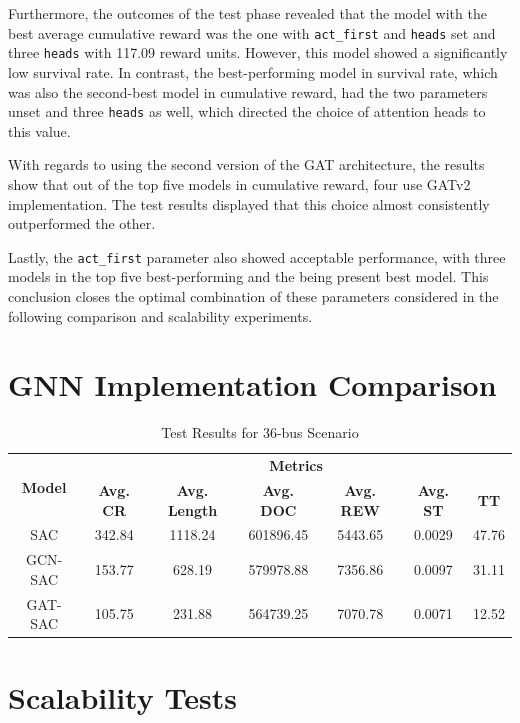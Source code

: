 Furthermore, the outcomes of the test phase revealed that the model with the best average cumulative reward was the one with \texttt{act\_first} and \texttt{heads} set and three \texttt{heads} with 117.09 reward units. However, this model showed a significantly low survival rate. In contrast, the best-performing model in survival rate, which was also the second-best model in cumulative reward, had the two parameters unset and three \texttt{heads} as well, which directed the choice of attention heads to this value.

With regards to using the second version of the \ac{GAT} architecture, the results show that out of the top five models in cumulative reward, four use GATv2 implementation. The test results displayed that this choice almost consistently outperformed the other. \par

Lastly, the \texttt{act\_first} parameter also showed acceptable performance, with three models in the top five best-performing and the being present best model. This conclusion closes the optimal combination of these parameters considered in the following comparison and scalability experiments.

\section{GNN Implementation Comparison} \label{sec:results-gnn-comp}

\begin{table}[h!]
	\centering
	\caption{Test Results for 36-bus Scenario}
	\begin{tabular}{ccccccc}
		\toprule
		\multirow{2}{*}{\textbf{Model}} & \multicolumn{6}{c}{\textbf{Metrics}} \\ 
		\cmidrule(lr){2-7}
		&  \textbf{Avg. CR} & \textbf{Avg. Length} & \textbf{Avg. DOC} & \textbf{Avg. REW} & \textbf{Avg. ST} & \textbf{TT} \\ 
		\midrule
		SAC & 342.84 & 1118.24 & 601896.45 & 5443.65 & 0.0029 & 47.76 \\
		GCN-SAC & 153.77 & 628.19 & 579978.88 & 7356.86 & 0.0097 & 31.11 \\
		GAT-SAC &105.75 & 231.88 & 564739.25 & 7070.78 & 0.0071 & 12.52 \\
		\bottomrule
	\end{tabular}
	\label{tab:test-gnn}
\end{table}

\section{Scalability Tests} \label{sec:results-scalability}

